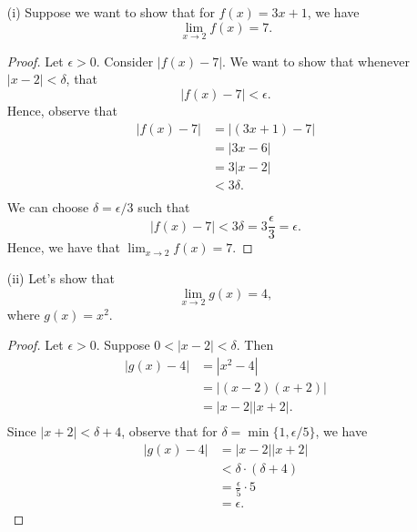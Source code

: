 \begin{enumerate}
    \item[(i)] Suppose we want to show that for \( f(x) = 3x + 1  \), we have 
        \[ \lim_{ x \to 2 } f(x) = 7. \]
        \begin{proof}
        Let \( \epsilon > 0  \). Consider \( | f(x) - 7  |  \). We want to show that whenever \( | x - 2  | < \delta \), that 
        \[  | f(x) - 7 | < \epsilon. \]
        Hence, observe that 
        \begin{align*}
            | f(x) - 7  | &= | (3x+1) - 7  |  \\
                          &= | 3x - 6  |  \\
                          &= 3| x - 2 | \\ 
                          &< 3 \delta. \\
        \end{align*}
        We can choose \( \delta = \epsilon / 3  \) such that 
        \[  | f(x) - 7  | < 3 \delta = 3 \frac{ \epsilon  }{ 3 } = \epsilon. \]
        Hence, we have that \( \lim_{ x \to 2 } f(x) = 7. \)
        \end{proof}
    \item[(ii)] Let's show that 
        \[  \lim_{ x \to 2  } g(x) = 4, \]
        where \( g(x) = x^2  \).
        \begin{proof}
        Let \( \epsilon > 0  \). Suppose \( 0 < | x - 2  | < \delta  \). Then 
        \begin{align*}
            | g(x) - 4  | &= | x^2 - 4  |  \\
                          &= | (x-2)(x+2) | \\
                          &= | x-2 | | x+2 |.\\
        \end{align*}
        Since \( |x + 2 | < \delta + 4   \), observe that for \( \delta = \min \{1, \epsilon / 5\}  \), we have 
        \begin{align*}
           | g(x) - 4  |  &= | x-2 | | x+2 |  \\
                          &< \delta \cdot (\delta + 4 ) \\
                          &= \frac{ \epsilon  }{ 5 } \cdot 5 \\
                          &= \epsilon.
        \end{align*}
        \end{proof}
\end{enumerate}

